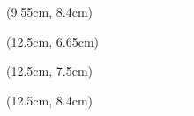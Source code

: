 \documentclass[aspectratio=3219]{beamer}
\begin{document}
{\begin{frame}
\begin{textblock*}{2.95cm}(9.55cm, 8.4cm)
    \centering
    \textcolor{white}{\tiny \it {{country3}} \\}
\end{textblock*}

\begin{textblock*}{2.95cm}(12.5cm, 6.65cm)
    \centering
    \textcolor{white}{\tiny \bf {{award4}}\\}
\end{textblock*}

\begin{textblock*}{2.95cm}(12.5cm, 7.5cm)
    \centering
    \textcolor{white}{\scriptsize {{surname4}} {{name4}} \\}
\end{textblock*}

\begin{textblock*}{2.95cm}(12.5cm, 8.4cm)
    \centering
    \textcolor{white}{\tiny \it {{country4}} \\}
\end{textblock*}

\end{frame}
}
\end{document}
